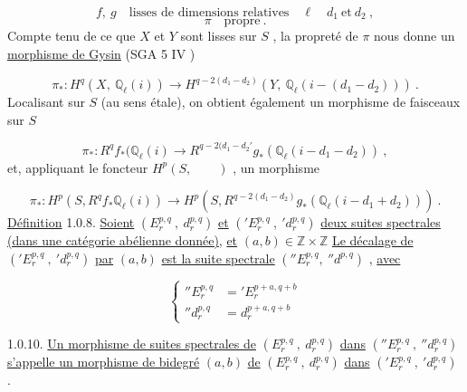
\begin{equation}\tag{1.0.3}
f,\ g \quad \text{lisses de dimensions relatives} \quad \ell \quad d_1 \ \text{et} \ d_2 \ ,
\end{equation}
\begin{equation}\tag{1.0.4}
\pi \quad \text{propre} \ .
\end{equation}
Compte tenu de ce que $X$ et $Y$ sont lisses sur $S$ , la propreté de $\pi$ nous donne un \underline{morphisme de Gysin} (SGA 5 IV \qquad )

\begin{equation}\tag{1.0 5}
\pi_* : H^q(X,\ \mathbb{Q}_\ell(i)) \longrightarrow H^{q-2(d_1-d_2)}(Y,\ \mathbb{Q}_\ell(i-(d_1-d_2))) \ .
\end{equation}
Localisant sur $S$ (au sens étale), on obtient également un morphisme de faisceaux sur $S$

\begin{equation}\tag{1.0.6}
\pi_* : R^q f_*(\mathbb{Q}_\ell(i) \longrightarrow R^{q-2(d_1-d_2'} g_*(\mathbb{Q}_\ell(i-d_1-d_2)) \ ,
\end{equation}
et, appliquant le foncteur $H^p(S, \qquad )$ , un morphisme

\begin{equation}\tag{1.0.7}
\pi_*: H^p(S,R^q f_*\mathbb{Q}_\ell(i)) \longrightarrow H^p(S,R^{q-2(d_1-d_2)} g_*(\mathbb{Q}_\ell(i-d_1+d_2))) \ .
\end{equation}
\underline{Définition} 1.0.8. \underline{Soient} $(E_r^{p,q}\ ,\ d_r^{p,q})$ \underline{et} $({}'E_r^{p,q}\ ,\ {}'d_r^{p,q})$ \underline{deux suites spectrales (dans une catégorie abélienne donnée)}, \underline{et} $(a, b) \in \mathbb{Z} \times \mathbb{Z}$ \underline{Le décalage de} $({}'E_r^{p,q}\ ,\ {}'d_r^{p,q})$ \underline{par} $(a, b)$ \underline{est la suite spectrale} $({}''E_r^{p,q},\ {}''d^{p,q})$ , \underline{avec}

\begin{equation}\tag{1.0.9}
\left\{
\begin{aligned}
{}''E_r^{p,q} &= {}'E_r^{p+a,q+b} \\
{}''d_r^{p,q} &= d_r^{p+a,q+b}
\end{aligned}
\right.
\end{equation}


1.0.10. \underline{Un morphisme de suites spectrales de} $(E_r^{p,q}\ ,\ d_r^{p,q})$ \underline{dans} $({}''E_r^{p,q}\ ,\ {}''d_r^{p,q})$ \underline{s'appelle un morphisme de bidegré} $(a, b)$ \underline{de} $(E_r^{p,q}\ ,\ d_r^{p,q})$ \underline{dans} $({}'E_r^{p,q}\ ,\ {}'d_r^{p,q})$ .

